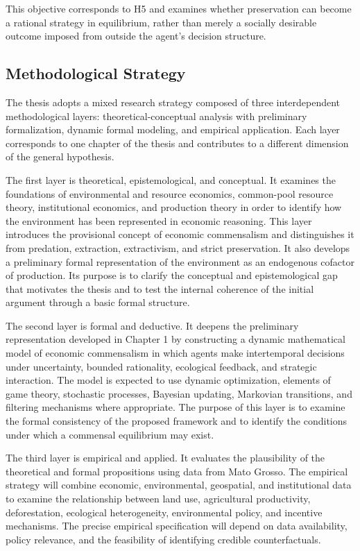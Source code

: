This objective corresponds to H5 and examines whether preservation can become a rational strategy in equilibrium, rather than merely a socially desirable outcome imposed from outside the agent's decision structure.

\subsection{Methodological Strategy}

The thesis adopts a mixed research strategy composed of three interdependent methodological layers: theoretical-conceptual analysis with preliminary formalization, dynamic formal modeling, and empirical application. Each layer corresponds to one chapter of the thesis and contributes to a different dimension of the general hypothesis.

The first layer is theoretical, epistemological, and conceptual. It examines the foundations of environmental and resource economics, common-pool resource theory, institutional economics, and production theory in order to identify how the environment has been represented in economic reasoning. This layer introduces the provisional concept of economic commensalism and distinguishes it from predation, extraction, extractivism, and strict preservation. It also develops a preliminary formal representation of the environment as an endogenous cofactor of production. Its purpose is to clarify the conceptual and epistemological gap that motivates the thesis and to test the internal coherence of the initial argument through a basic formal structure.

The second layer is formal and deductive. It deepens the preliminary representation developed in Chapter 1 by constructing a dynamic mathematical model of economic commensalism in which agents make intertemporal decisions under uncertainty, bounded rationality, ecological feedback, and strategic interaction. The model is expected to use dynamic optimization, elements of game theory, stochastic processes, Bayesian updating, Markovian transitions, and filtering mechanisms where appropriate. The purpose of this layer is to examine the formal consistency of the proposed framework and to identify the conditions under which a commensal equilibrium may exist.

The third layer is empirical and applied. It evaluates the plausibility of the theoretical and formal propositions using data from Mato Grosso. The empirical strategy will combine economic, environmental, geospatial, and institutional data to examine the relationship between land use, agricultural productivity, deforestation, ecological heterogeneity, environmental policy, and incentive mechanisms. The precise empirical specification will depend on data availability, policy relevance, and the feasibility of identifying credible counterfactuals.

